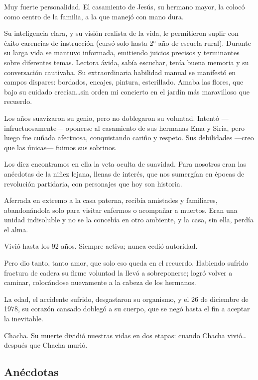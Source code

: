 \documentclass[a4paper]{article}
\begin{document}
\bigbreak{}

Muy fuerte personalidad. El casamiento de Jesús, su hermano mayor, la colocó como centro de la familia, a la que manejó con mano dura.

Su inteligencia clara, y su visión realista de la vida, le permitieron suplir con éxito carencias de instrucción (cursó solo hasta 2$^o$ año de escuela rural). Durante su larga vida se mantuvo informada, emitiendo juicios precisos y terminantes sobre diferentes temas. Lectora ávida, sabía escuchar, tenía buena memoria y su conversación cautivaba. Su extraordinaria habilidad manual se manifestó en campos dispares: bordados, encajes, pintura, esterillado. Amaba las flores, que bajo su cuidado crecían\ldots sin orden mi concierto en el jardín más maravilloso que recuerdo.

Los años suavizaron su genio, pero no doblegaron su voluntad. Intentó ---infructuosamente--- oponerse al casamiento de sus hermanas Ema y Siria, pero luego fue cuñada afectuosa, conquistando cariño y respeto. Sus debilidades ---creo que las únicas--- fuimos sus sobrinos.

Los diez encontramos en ella la veta oculta de suavidad. Para nosotros eran las anécdotas de la niñez lejana, llenas de interés, que nos sumergían en épocas de revolución partidaria, con personajes que hoy son historia.

Aferrada en extremo a la casa paterna, recibía amistades y familiares, abandonándola solo para visitar enfermos o acompañar a muertos. Eran una unidad indisoluble y no se la concebía en otro ambiente, y la casa, sin ella, perdía el alma.

Vivió hasta los 92 años. Siempre activa; nunca cedió autoridad.

Pero dio tanto, tanto amor, que solo eso queda en el recuerdo. Habiendo sufrido fractura de cadera su firme voluntad la llevó a sobreponerse; logró volver a caminar, colocándose nuevamente a la cabeza de los hermanos.

La edad, el accidente sufrido, desgastaron su organismo, y el 26 de diciembre de 1978, su corazón cansado doblegó a su cuerpo, que se negó hasta el fin a aceptar la inevitable.

Chacha. Su muerte dividió nuestras vidas en dos etapas: cuando Chacha vivió\ldots después que Chacha murió.

\subsection{Anécdotas}
\end{document}
